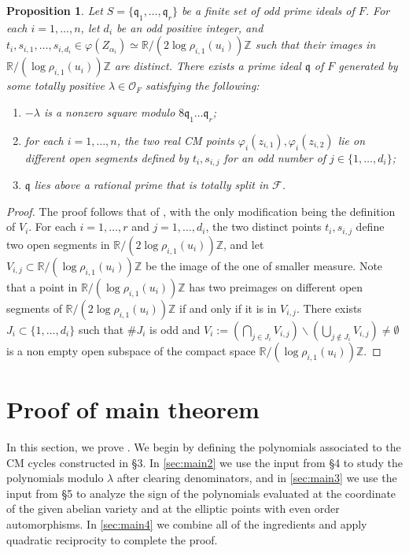 \documentclass{amsart}
\numberwithin{equation}{subsection}
\numberwithin{theorem}{section}
\newtheorem{proposition}[theorem]{Proposition}
\theoremstyle{definition}
\theoremstyle{remark}
\newcommand{\bR}{\mathbb{R}}
\newcommand{\bZ}{\mathbb{Z}}
\newcommand{\cF}{\mathcal{F}}
\newcommand{\cO}{\mathcal{O}}
\newcommand{\fq}{\mathfrak{q}}
\begin{document}
\begin{proposition} \label{prop:equidistribution_odd}
    Let $S = \{\fq_1, \dotsc, \fq_r\}$ be a finite set of odd prime ideals of $F$. 
    For each $i=1, \dotsc, n$, let $d_i$ be an odd positive integer, and $t_{i}, s_{i,1}, \dotsc, s_{i,d_i} \in \varphi(Z_{\alpha_i}) \simeq \mathbb{R}/(2\log \rho_{i,1}(u_i))\bZ $ such that their images in $ \mathbb{R}/(\log \rho_{i,1}(u_i))\bZ $ are distinct. There exists a prime ideal $\fq$ of $F$ generated by some totally positive $\lambda\in\cO_F$ satisfying the following: \begin{enumerate}
        \item $-\lambda$ is a nonzero square modulo $8\fq_1\dotsc\fq_r$; 
        \item for each  $i=1, \dotsc, n$, the two real CM points $\varphi_i(z_{i,1}), \varphi_{i}(z_{i,2})$ lie on different open segments defined by $t_{i}, s_{i, j}$ for an odd number of $j\in \{1, \dotsc, d_i\}$;
         \item $\fq$ lies above a rational prime that is totally split in $\cF$.
    \end{enumerate}
\end{proposition}    
\begin{proof}
    The proof follows that of , with the only modification being the definition of $V_i$. 
    For each $i=1, \dotsc, r$ and $j=1, \dotsc, d_i$, the two distinct points $t_i, s_{i,j}$ define two open segments in $\bR/(2\log \rho_{i,1}(u_i)) \bZ$, and let $V_{i,j}\subset \bR/(\log \rho_{i,1}(u_i)) \bZ$ be the image of the one of smaller measure. 
    Note that a point  in $\bR/(\log \rho_{i,1}(u_i)) \bZ$ has two preimages on different open segments of $\bR/(2\log \rho_{i,1}(u_i)) \bZ$ if and only if it is in $V_{i,j}$. 
    There exists $J_i \subset \{1, \dotsc, d_i\}$ such that $\#J_i$ is odd and $V_i :=(\bigcap_{j\in J_i} V_{i,j}) \backslash(\bigcup_{j\notin J_i} V_{i,j})\neq \emptyset$ is a non empty open subspace of the compact space $\bR/(\log \rho_{i,1}(u_i)) \bZ$.
\end{proof}



\section{Proof of main theorem}

In this section, we prove . We begin by defining the polynomials associated to the CM cycles constructed in \S3.  In \cref{sec:main2} we use the input from \S4 to study the polynomials modulo $\lambda$ after clearing denominators, and in \cref{sec:main3} we use the input from \S5 to analyze the sign of the polynomials evaluated at the coordinate of the given abelian variety and at the elliptic points with even order automorphisms. In \cref{sec:main4} we combine all of the ingredients and apply quadratic reciprocity to complete the proof.
\end{document}

